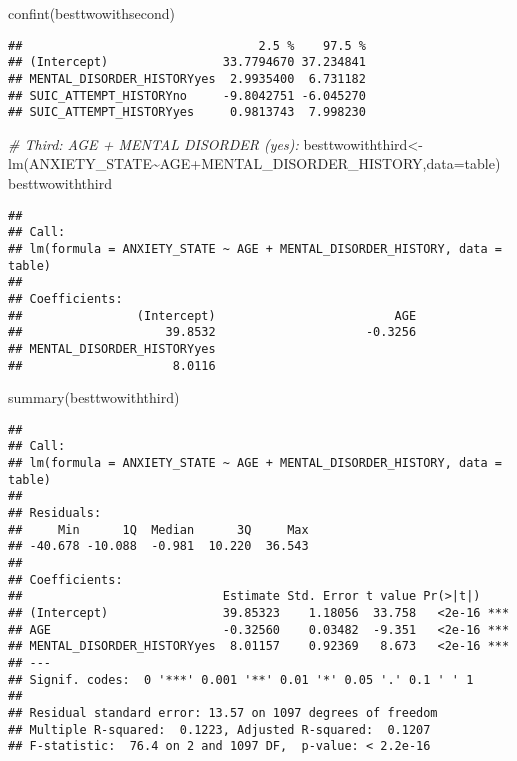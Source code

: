 \documentclass[
]{book}
\newenvironment{Shaded}{\begin{snugshade}}{\end{snugshade}}
\newcommand{\AttributeTok}[1]{\textcolor[rgb]{0.77,0.63,0.00}{#1}}
\newcommand{\CommentTok}[1]{\textcolor[rgb]{0.56,0.35,0.01}{\textit{#1}}}
\newcommand{\FunctionTok}[1]{\textcolor[rgb]{0.00,0.00,0.00}{#1}}
\newcommand{\NormalTok}[1]{#1}
\newcommand{\OtherTok}[1]{\textcolor[rgb]{0.56,0.35,0.01}{#1}}
\newcommand{\SpecialCharTok}[1]{\textcolor[rgb]{0.00,0.00,0.00}{#1}}
\begin{document}
\begin{Shaded}
\begin{Highlighting}[]
\FunctionTok{confint}\NormalTok{(besttwowithsecond)}
\end{Highlighting}
\end{Shaded}

\begin{verbatim}
##                                 2.5 %    97.5 %
## (Intercept)                33.7794670 37.234841
## MENTAL_DISORDER_HISTORYyes  2.9935400  6.731182
## SUIC_ATTEMPT_HISTORYno     -9.8042751 -6.045270
## SUIC_ATTEMPT_HISTORYyes     0.9813743  7.998230
\end{verbatim}

\begin{Shaded}
\begin{Highlighting}[]
\CommentTok{\# Third: AGE + MENTAL DISORDER (yes):}
\NormalTok{besttwowiththird}\OtherTok{\textless{}{-}}\FunctionTok{lm}\NormalTok{(ANXIETY\_STATE}\SpecialCharTok{\textasciitilde{}}\NormalTok{AGE}\SpecialCharTok{+}\NormalTok{MENTAL\_DISORDER\_HISTORY,}\AttributeTok{data=}\NormalTok{table)}
\NormalTok{besttwowiththird}
\end{Highlighting}
\end{Shaded}

\begin{verbatim}
## 
## Call:
## lm(formula = ANXIETY_STATE ~ AGE + MENTAL_DISORDER_HISTORY, data = table)
## 
## Coefficients:
##                (Intercept)                         AGE  
##                    39.8532                     -0.3256  
## MENTAL_DISORDER_HISTORYyes  
##                     8.0116
\end{verbatim}

\begin{Shaded}
\begin{Highlighting}[]
\FunctionTok{summary}\NormalTok{(besttwowiththird)}
\end{Highlighting}
\end{Shaded}

\begin{verbatim}
## 
## Call:
## lm(formula = ANXIETY_STATE ~ AGE + MENTAL_DISORDER_HISTORY, data = table)
## 
## Residuals:
##     Min      1Q  Median      3Q     Max 
## -40.678 -10.088  -0.981  10.220  36.543 
## 
## Coefficients:
##                            Estimate Std. Error t value Pr(>|t|)    
## (Intercept)                39.85323    1.18056  33.758   <2e-16 ***
## AGE                        -0.32560    0.03482  -9.351   <2e-16 ***
## MENTAL_DISORDER_HISTORYyes  8.01157    0.92369   8.673   <2e-16 ***
## ---
## Signif. codes:  0 '***' 0.001 '**' 0.01 '*' 0.05 '.' 0.1 ' ' 1
## 
## Residual standard error: 13.57 on 1097 degrees of freedom
## Multiple R-squared:  0.1223, Adjusted R-squared:  0.1207 
## F-statistic:  76.4 on 2 and 1097 DF,  p-value: < 2.2e-16
\end{verbatim}
\end{document}

